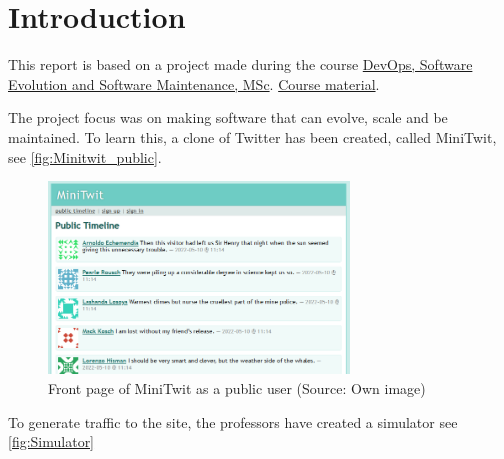 \section{Introduction}

This report is based on a project made during the course \href{https://learnit.itu.dk/local/coursebase/view.php?ciid=909}{DevOps, Software Evolution and Software Maintenance, MSc}. \href{https://github.com/itu-devops/lecture_notes/tree/e44664f50c8b0ffb30a77a29e305df3f6750d5d4}{Course material}. 

The project focus was on making software that can evolve, scale and be maintained. To learn this, a clone of Twitter has been created, called MiniTwit, see \autoref{fig:Minitwit_public}.

\begin{figure}[!ht]
    \centering
    \captionsetup{justification=centering,margin=1cm}
    \includegraphics[width=80mm]{images/introduction/minitwitFrontPage.png}
    \caption{Front page of MiniTwit as a public user (Source: Own image)}
    \label{fig:Minitwit_public}
\end{figure}

To generate traffic to the site, the professors have created a simulator see \autoref{fig:Simulator}

